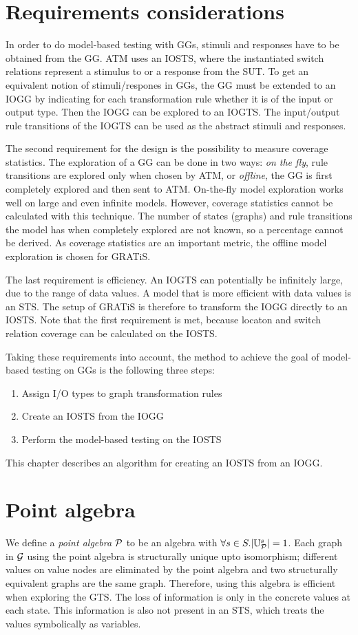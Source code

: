 \section{Requirements considerations}
In order to do model-based testing with GGs, stimuli and responses have to be obtained from the GG. ATM uses an IOSTS, where the instantiated switch relations represent a stimulus to or a response from the SUT. To get an equivalent notion of stimuli/respones in GGs, the GG must be extended to an IOGG by indicating for each transformation rule whether it is of the input or output type. Then the IOGG can be explored to an IOGTS. The input/output rule transitions of the IOGTS can be used as the abstract stimuli and responses.

The second requirement for the design is the possibility to measure coverage statistics. The exploration of a GG can be done in two ways: \textit{on the fly}, rule transitions are explored only when chosen by ATM, or \textit{offline}, the GG is first completely explored and then sent to ATM. On-the-fly model exploration works well on large and even infinite models. However, coverage statistics cannot be calculated with this technique. The number of states (graphs) and rule transitions the model has when completely explored are not known, so a percentage cannot be derived. As coverage statistics are an important metric, the offline model exploration is chosen for GRATiS.

The last requirement is efficiency. An IOGTS can potentially be infinitely large, due to the range of data values. A model that is more efficient with data values is an STS. The setup of GRATiS is therefore to transform the IOGG directly to an IOSTS. Note that the first requirement is met, because locaton and switch relation coverage can be calculated on the IOSTS.

Taking these requirements into account, the method to achieve the goal of model-based testing on GGs is the following three steps:
\begin{enumerate}
\item Assign I/O types to graph transformation rules
\item Create an IOSTS from the IOGG
\item Perform the model-based testing on the IOSTS
\end{enumerate}
This chapter describes an algorithm for creating an IOSTS from an IOGG.

\section{Point algebra}
We define a \textit{point algebra} $\mathcal{P}$ to be an algebra with $\forall s \in S . |\mathbb{U}_{\mathcal{P}}^s| = 1$. Each graph in $\mathcal{G}$ using the point algebra is structurally unique upto isomorphism; different values on value nodes are eliminated by the point algebra and two structurally equivalent graphs are the same graph. Therefore, using this algebra is efficient when exploring the GTS. The loss of information is only in the concrete values at each state. This information is also not present in an STS, which treats the values symbolically as variables.


